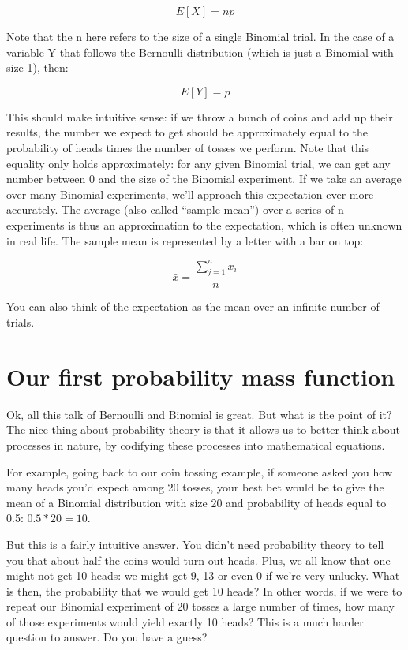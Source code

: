 \documentclass[
]{book}
\begin{document}
\[E[X] = np\]

Note that the n here refers to the size of a single Binomial trial. In the case of a variable Y that follows the Bernoulli distribution (which is just a Binomial with size 1), then:

\[E[Y] = p\]

This should make intuitive sense: if we throw a bunch of coins and add up their results, the number we expect to get should be approximately equal to the probability of heads times the number of tosses we perform. Note that this equality only holds approximately: for any given Binomial trial, we can get any number between 0 and the size of the Binomial experiment. If we take an average over many Binomial experiments, we'll approach this expectation ever more accurately. The average (also called ``sample mean'') over a series of n experiments is thus an approximation to the expectation, which is often unknown in real life. The sample mean is represented by a letter with a bar on top:

\[\bar{x} = \frac{\sum_{j=1}^{n}x_{i}}{n}\]

You can also think of the expectation as the mean over an infinite number of trials.

\hypertarget{our-first-probability-mass-function}{%
\section{Our first probability mass function}\label{our-first-probability-mass-function}}

Ok, all this talk of Bernoulli and Binomial is great. But what is the point of it? The nice thing about probability theory is that it allows us to better think about processes in nature, by codifying these processes into mathematical equations.

For example, going back to our coin tossing example, if someone asked you how many heads you'd expect among 20 tosses, your best bet would be to give the mean of a Binomial distribution with size 20 and probability of heads equal to 0.5: \(0.5*20=10\).

But this is a fairly intuitive answer. You didn't need probability theory to tell you that about half the coins would turn out heads. Plus, we all know that one might not get 10 heads: we might get 9, 13 or even 0 if we're very unlucky. What is then, the probability that we would get 10 heads? In other words, if we were to repeat our Binomial experiment of 20 tosses a large number of times, how many of those experiments would yield exactly 10 heads? This is a much harder question to answer. Do you have a guess?
\end{document}
